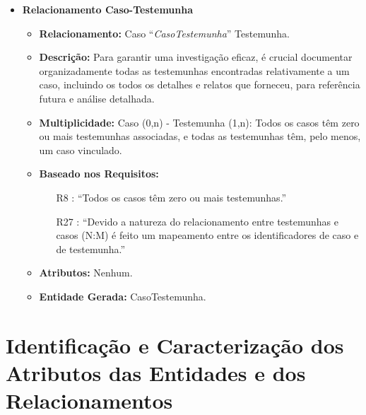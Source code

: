 \documentclass[a4paper,12pt]{scrreprt}
\begin{document}
\begin{itemize}
        \item\textbf{Relacionamento Caso-Testemunha}
        \begin{itemize}
            \item\textbf{Relacionamento:} Caso “\textit{CasoTestemunha}” Testemunha.
            \item\textbf{Descrição:} Para garantir uma investigação eficaz, é crucial documentar organizadamente todas as testemunhas encontradas relativamente a um caso, incluindo os todos os detalhes e relatos que forneceu, para referência futura e análise detalhada.
            \item\textbf{Multiplicidade:} Caso (0,n) - Testemunha (1,n): Todos os casos têm zero ou mais testemunhas associadas, e todas as testemunhas têm, pelo menos, um caso vinculado.
            \item\textbf{Baseado nos Requisitos:}
            \begin{itemize}
                \item [R8]: “Todos os casos têm zero ou mais testemunhas.”
                \item [R27]: “Devido a natureza do relacionamento entre testemunhas e casos (N:M) é feito um mapeamento entre os identificadores de caso e de testemunha.”
            \end{itemize}
            \item\textbf{Atributos:} Nenhum.
            \item\textbf{Entidade Gerada:} CasoTestemunha.
        \end{itemize}
        \end{itemize}

    \clearpage
    \section{Identificação e Caracterização dos Atributos das Entidades e dos Relacionamentos}
        
\end{document}
